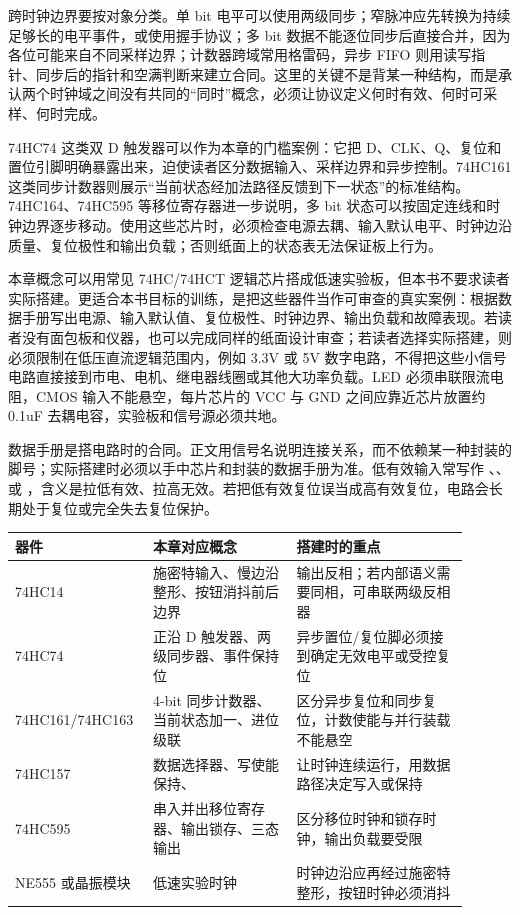跨时钟边界要按对象分类。单 bit 电平可以使用两级同步；窄脉冲应先转换为持续足够长的电平事件，或使用握手协议；多 bit 数据不能逐位同步后直接合并，因为各位可能来自不同采样边界；计数器跨域常用格雷码，异步 FIFO 则用读写指针、同步后的指针和空满判断来建立合同。这里的关键不是背某一种结构，而是承认两个时钟域之间没有共同的“同时”概念，必须让协议定义何时有效、何时可采样、何时完成。

\begin{chipcase}
74HC74 这类双 D 触发器可以作为本章的门槛案例：它把 D、CLK、Q、复位和置位引脚明确暴露出来，迫使读者区分数据输入、采样边界和异步控制。74HC161 这类同步计数器则展示“当前状态经加法路径反馈到下一状态”的标准结构。74HC164、74HC595 等移位寄存器进一步说明，多 bit 状态可以按固定连线和时钟边界逐步移动。使用这些芯片时，必须检查电源去耦、输入默认电平、时钟边沿质量、复位极性和输出负载；否则纸面上的状态表无法保证板上行为。
\end{chipcase}


本章概念可以用常见 74HC/74HCT 逻辑芯片搭成低速实验板，但本书不要求读者实际搭建。更适合本书目标的训练，是把这些器件当作可审查的真实案例：根据数据手册写出电源、输入默认值、复位极性、时钟边界、输出负载和故障表现。若读者没有面包板和仪器，也可以完成同样的纸面设计审查；若读者选择实际搭建，则必须限制在低压直流逻辑范围内，例如 3.3V 或 5V 数字电路，不得把这些小信号电路直接接到市电、电机、继电器线圈或其他大功率负载。LED 必须串联限流电阻，CMOS 输入不能悬空，每片芯片的 VCC 与 GND 之间应靠近芯片放置约 0.1uF 去耦电容，实验板和信号源必须共地。

数据手册是搭电路时的合同。正文用信号名说明连接关系，而不依赖某一种封装的脚号；实际搭建时必须以手中芯片和封装的数据手册为准。低有效输入常写作 、、 或 ，含义是拉低有效、拉高无效。若把低有效复位误当成高有效复位，电路会长期处于复位或完全失去复位保护。

\begin{longtable}{L{0.24\linewidth}L{0.3\linewidth}L{0.36\linewidth}}
\toprule
器件 & 本章对应概念 & 搭建时的重点 \\
\midrule
74HC14 & 施密特输入、慢边沿整形、按钮消抖前后边界 & 输出反相；若内部语义需要同相，可串联两级反相器 \\
74HC74 & 正沿 D 触发器、两级同步器、事件保持位 & 异步置位/复位脚必须接到确定无效电平或受控复位 \\
74HC161/74HC163 & 4-bit 同步计数器、当前状态加一、进位级联 & 区分异步复位和同步复位，计数使能与并行装载不能悬空 \\
74HC157 & 数据选择器、写使能保持、 & 让时钟连续运行，用数据路径决定写入或保持 \\
74HC595 & 串入并出移位寄存器、输出锁存、三态输出 & 区分移位时钟和锁存时钟，输出负载要受限 \\
NE555 或晶振模块 & 低速实验时钟 & 时钟边沿应再经过施密特整形，按钮时钟必须消抖 \\
\bottomrule
\end{longtable}

